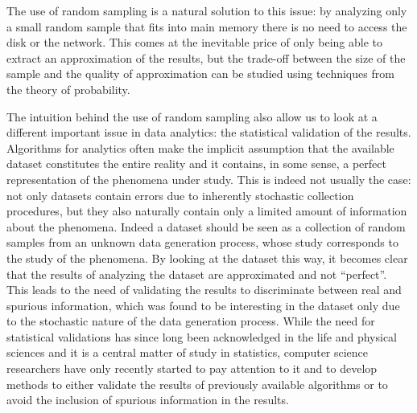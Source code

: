 The use of random sampling is a natural solution to this issue:
by analyzing only a small random sample that fits into main memory there is no
need to access the disk or the network. This comes at the inevitable price of
only being able to extract an approximation of the results, but the trade-off
between the size of the sample and the quality of approximation can be studied
using techniques from the theory of probability. 

The intuition behind the use of random sampling also allow us to look at a
different important issue in data analytics: the statistical validation of the
results. Algorithms for analytics often make the implicit assumption that the
available dataset constitutes the entire reality and it contains, in some sense,
a perfect representation of the phenomena under study. This is indeed not
usually the case: not only datasets contain errors due to inherently stochastic
collection procedures, but they also naturally contain only a limited amount of
information about the phenomena. Indeed a dataset should be seen as a collection
of random samples from an unknown data generation process, whose study
corresponds to the study of the phenomena. By looking at the dataset this way,
it becomes clear that the results of analyzing the dataset are approximated and
not ``perfect''. This leads to the need of validating the results to
discriminate between real and spurious information, which was found to be
interesting in the dataset only due to the stochastic nature of the data
generation process. While the need for statistical validations has since long
been acknowledged in the life and physical sciences and it is a central matter of
study in statistics, computer science researchers have only recently started to
pay attention to it and to develop methods to either validate the results of
previously available algorithms or to avoid the inclusion of spurious
information in the results.

